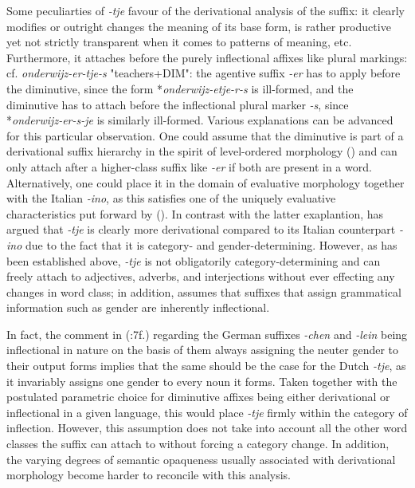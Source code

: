 Some peculiarties of \textit{-tje} favour of the derivational analysis of the suffix: it clearly modifies or outright changes the meaning of its base form, is rather productive yet not strictly transparent when it comes to patterns of meaning, etc. Furthermore, it attaches before the purely inflectional affixes like plural markings: cf. \textit{onderwijz-er-tje-s} "teachers+DIM": the agentive suffix \textit{-er} has to apply before the diminutive, since the form *\textit{onderwijz-etje-r-s} is ill-formed, and the diminutive has to attach before the inflectional plural marker \textit{-s}, since *\textit{onderwijz-er-s-je} is similarly ill-formed. Various explanations can be advanced for this particular observation. One could assume that the diminutive is part of a derivational suffix hierarchy in the spirit of level-ordered morphology (\cite{Siegel+1974}) and can only attach after a higher-class suffix like \textit{-er} if both are present in a word. Alternatively, one could place it in the domain of evaluative morphology together with the Italian \textit{-ino}, as this satisfies one of the uniquely evaluative characteristics put forward by \citeauthor{Scalise+1986} (\citeyear{Scalise+1986}). In contrast with the latter exaplantion, \citeauthor{Booij+2000} has argued that \textit{-tje} is clearly more derivational compared to its Italian counterpart \textit{-ino} due to the fact that it is category- and gender-determining. However, as has been established above, \textit{-tje} is not obligatorily category-determining and can freely attach to adjectives, adverbs, and interjections without ever effecting any changes in word class; in addition, \cite{Schneider+2003} assumes that suffixes that assign grammatical information such as gender are inherently inflectional.

In fact, the comment in \citeauthor{Schneider+2003} (\citeyear{Schneider+2003}:7f.) regarding the German suffixes \textit{-chen} and \textit{-lein} being inflectional in nature on the basis of them always assigning the neuter gender to their output forms implies that the same should be the case for the Dutch \textit{-tje}, as it invariably assigns one gender to every noun it forms. Taken together with the postulated parametric choice for diminutive affixes being either derivational or inflectional in a given language, this would place \textit{-tje} firmly within the category of inflection. However, this assumption does not take into account all the other word classes the suffix can attach to without forcing a category change. In addition, the varying degrees of semantic opaqueness usually associated with derivational morphology become harder to reconcile with this analysis. 

